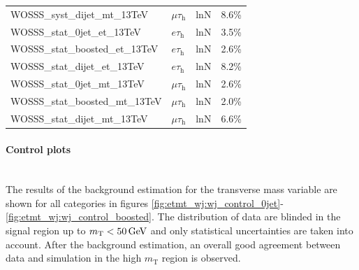 \begin{table}
\begin{tabular}{llll}
        WOSSS\_syst\_dijet\_mt\_13TeV & $\mu\tau_\text{h}$ & lnN &  8.6\%     \\   
        WOSSS\_stat\_0jet\_et\_13TeV & $e\tau_\text{h}$ & lnN &  3.5\%     \\   
        WOSSS\_stat\_boosted\_et\_13TeV & $e\tau_\text{h}$ & lnN &  2.6\%     \\   
        WOSSS\_stat\_dijet\_et\_13TeV & $e\tau_\text{h}$ & lnN &  8.2\%     \\
        WOSSS\_stat\_0jet\_mt\_13TeV & $\mu\tau_\text{h}$ & lnN &  2.6\%     \\   
        WOSSS\_stat\_boosted\_mt\_13TeV & $\mu\tau_\text{h}$ & lnN &  2.0\%     \\   
        WOSSS\_stat\_dijet\_mt\_13TeV & $\mu\tau_\text{h}$ & lnN &  6.6\%     \\  \bottomrule  
    \end{tabular}
\end{table}
 
\paragraph{Control plots}\mbox{} \\
The results of the background estimation for the transverse mass variable are shown for all categories in figures \ref{fig:etmt_wj:wj_control_0jet}-\ref{fig:etmt_wj:wj_control_boosted}. The distribution of data are blinded in the signal region up 
to $m_\text{T}<\text{50\,GeV}$ and only statistical uncertainties are taken into account. 
After the background estimation, an overall good agreement between data and simulation in the high $m_\text{T}$ region is observed.

